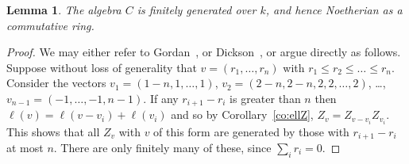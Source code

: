 \documentclass[12pt]{amsart}
\renewcommand{\le}{\leqslant}
\numberwithin{equation}{section}
\newtheorem{lemma}[equation]{Lemma}
\theoremstyle{definition}
\begin{document}
\begin{lemma}\label{le:Cfg/k}
The algebra $C$ is finitely generated over $k$, and hence Noetherian
as a commutative ring.
\end{lemma}
\begin{proof}
We may either refer to Gordan~\cite{Gordan:1873a}, or
Dickson~\cite{Dickson:1913a}, or argue directly as follows. Suppose
without loss of generality that $v=(r_1,\dots,r_n)$ with 
$r_1\le r_2\le \dots \le r_n$. Consider
the vectors $v_1=(1-n,1,\dots,1)$, $v_2=(2-n,2-n,2,2,\dots,2)$, \dots,
$v_{n-1}=(-1,\dots,-1,n-1)$. If any $r_{i+1}-r_i$ is greater than $n$
then $\ell(v)=\ell(v-v_i)+\ell(v_i)$ and so by
Corollary~\ref{co:ellZ}, $Z_v=Z_{v-v_i}Z_{v_i}$. This shows that all
$Z_v$ with $v$ of
this form are generated by those with $r_{i+1}-r_i$ at most
$n$. There are only finitely many of these, since $\sum_i r_i=0$.
\end{proof}
\end{document}

